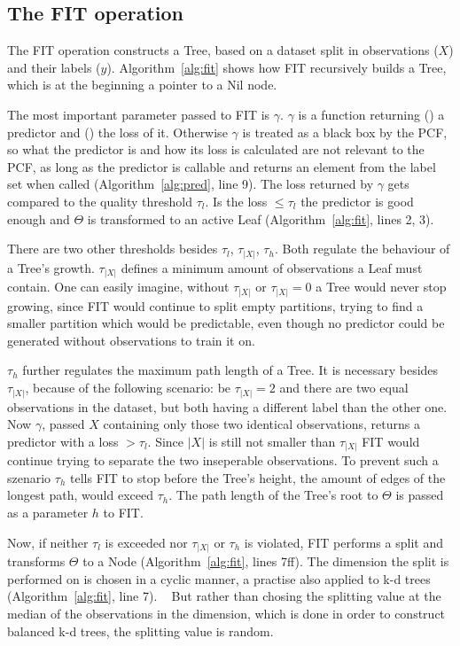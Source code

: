 \subsection{The FIT operation}
\label{subsec:fit}

The FIT operation constructs a Tree, based on a dataset
split in observations ($X$) and their labels ($y$).
Algorithm~\ref{alg:fit} shows how FIT recursively builds a
Tree, which is at the beginning a pointer to a Nil node.

The most important parameter passed to FIT is $\gamma$.
$\gamma$ is a function returning () a
predictor and () the loss of it. Otherwise
$\gamma$ is treated as a black box by the PCF, so what the
predictor is and how its loss is calculated are not
relevant to the PCF, as long as the predictor is callable
and returns an element from the label set when called
(Algorithm~\ref{alg:pred}, line 9). The loss returned
by $\gamma$ gets compared to the quality threshold
$\tau_l$. Is the loss $\leq \tau_l$ the predictor is good
enough and $\Theta$ is transformed to an active Leaf
(Algorithm~\ref{alg:fit}, lines 2, 3).

There are two other thresholds besides $\tau_l$,
$\tau_{|X|}$, $\tau_h$. Both regulate the behaviour of a
Tree's growth. $\tau_{|X|}$ defines a minimum amount of
observations a Leaf must contain. One can easily imagine,
without $\tau_{|X|}$ or $\tau_{|X|} = 0$ a Tree would
never stop growing, since FIT would continue to split empty
partitions, trying to find a smaller partition which would
be predictable, even though no predictor could be
generated without observations to train it on.

$\tau_h$ further regulates the maximum path length of a
Tree. It is necessary besides $\tau_{|X|}$, because of the
following scenario: be $\tau_{|X|} = 2$ and there are two
equal observations in the dataset, but both having a
different label than the other one. Now $\gamma$, passed
$X$ containing only those two identical observations,
returns a predictor with a loss $> \tau_l$. Since $|X|$ is
still not smaller than $\tau_{|X|}$ FIT would continue
trying to separate the two inseperable observations. To
prevent such a szenario $\tau_h$ tells FIT to stop before
the Tree's height, the amount of edges of the longest path,
would exceed $\tau_h$. The path length of the Tree's root
to $\Theta$ is passed as a parameter $h$ to FIT.

Now, if neither $\tau_l$ is exceeded nor $\tau_{|X|}$ or
$\tau_h$ is violated, FIT performs a split and transforms
$\Theta$ to a Node (Algorithm~\ref{alg:fit}, lines 7ff).
The dimension the split is performed on is chosen in a
cyclic manner, a practise also applied to k-d trees
(Algorithm~\ref{alg:fit}, line 7).%
~\cite{Brown2015kdtree}
But rather than chosing the splitting value at the median
of the observations in the dimension, which is done in
order to construct balanced k-d trees, the splitting value
is random.\cite{Brown2015kdtree}

